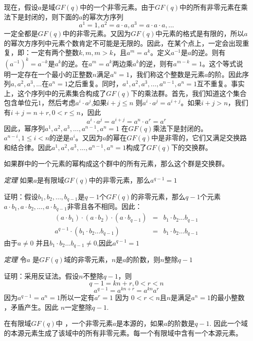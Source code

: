 \documentclass[10pt,a4paper,UTF8]{article}
\begin{document}
现在，假设\(a\)是域\(GF(q)\)中的一个非零元素。由于\(GF(q)\)中的所有非零元素在乘法下是封闭的，则下面的\(a\)的幂次方序列\[a^{1} = 1, a^{2}= a\cdot a, a^{3}=a\cdot a \cdot a,\ldots\] 一定全都是\(GF(q)\)中的非零元素。又因为\(GF(q)\)中元素的格式是有限的，所以\(a\)的幂次方序列中元素个数肯定不可能是无限的。因此，在某个点上，一定会出现重复，即：一定有两个整数\(k,m, m > k\)，且\(a^{m} = a^{k}\)。定义\(a^{-1}\)是\(a\)的逆。则有\((a^{-1})^{k} = a^{-k}\)是\(a^{k}\)的逆。在\(a^{m} = a^{k}\)两边乘\(a^{k}\)的逆，则有\(a^{m-k} = 1\)。这个等式说明一定存在一个最小的正整数\(n\)满足\(a^{n}=1\)，我们称这个整数是元素\(a\)的阶。因此序列\(a,a^{2},a^{3},\ldots\)在\(a^{n}=1\)之后重复。同时，\(a^{1},a^{2},a^{3},\ldots,a^{n-1},a^{n}=1\)互不重复。事实上，这个序列中的元素集合构成了\(GF(q)\)下的乘法群。首先，我们知道这个集合包含单位元\(1\)，然后考虑\(a^{i}\cdot a^{j}\),如果\(i+j\leq n\) 则\(a^{i}\cdot a^{j} = a^{i+j}\)。如果\(i+j > n\)，我们有\(i+j = n +r, 0 < r \leq n\)，因此\[a^{i}\cdot a^{j} = a^{i+j} = a^{n}\cdot a^{r} = a^{r}\] 因此，幂序列\(a^{1},a^{2},a^{3},\ldots,a^{n-1},a^{n}=1\) 在\(GF(q)\)乘法下是封闭的。\(a^{n-i}, 1\leq i < n\)的逆是\(a^{i}\)。又因为\(a\)的幂在\(GF(q)\)中是非零的，它们又满足交换路和结合律。因此\(a^{1},a^{2},a^{3},\ldots,a^{n-1},a^{n}=1\)构成了\(GF(q)\)下的交换群。

如果群中的一个元素的幂构成这个群中的所有元素，那么这个群是交换群。

\emph{定理} 如果\(a\)是有限域\(GF(q)\)中的非零元素，那么\(a^{q-1}=1\)

证明：假设\(b_{1},b_{2},\ldots,b_{q-1}\)是\(q-1\)个\(GF(q)\)的非零元素，那么\(q-1\)个元素\(a\cdot b_{1}, a\cdot b_{2}, \ldots , a\cdot b_{q-1}\)非零且各不相同。因此：
\begin{eqnarray*}
(a\cdot b_{1})\cdot (a\cdot b_{2}) \cdot (a\cdot b_{q-1})&=&b_{1}\cdot b_{2}\ldots b_{q-1} \\
a^{q-1}\cdot (b_{1}\cdot b_{2}\ldots b_{q-1}) &=& b_{1}\cdot b_{2}\ldots b_{q-1}
\end{eqnarray*}
由于\(a\neq 0\) 并且\(b_{1}\cdot b_{2}\ldots b_{q-1}\neq 0\),因此\(a^{q-1}=1\)

\emph{定理} 令\(a\) 是\(GF(q)\)域的非零元素，\(n\)是\(a\)的阶数，则\(n\)整除\(q-1\)

证明：采用反证法。假设\(n\)不整除\(q-1\)，则\[q-1 = kn +r, 0 < r < n \] \[a^{q-1} = a^{kn+r} = a^{kn}a^{r}\]
因为\(a^{q-1} = a^{n} =1\)所以一定有\(a^{r}=1\) 因为 \(0 < r < n\)且\(n\)是满足\(a^{n}=1\)的最小整数 ，矛盾产生。因此 \(n\)一定整除\(q-1\).

在有限域\(GF(q)\)中 ，一个非零元素\(a\)是本源的，如果\(a\)的阶数是\(q-1\). 因此一个域的本源元素生成了该域中的所有非零元素。每一个有限域中含有一个本源元素。
\end{document}
